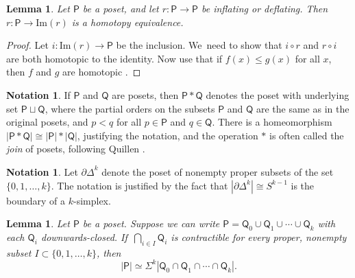 \documentclass[11pt]{article}
\theoremstyle{plain}
\newtheorem{lem}[thm]{Lemma}
\theoremstyle{definition}
\newtheorem{notation}[thm]{Notation}
\newcommand{\Po}{\mathsf{P}}
\begin{document}
\begin{lem}\label{monotone}Let $\mathsf P$ be a poset, and let $r\colon\mathsf P\to \mathsf P$ be inflating or deflating. Then $r\colon\mathsf P\to \mathrm{Im}(r)$ is a homotopy equivalence.
\end{lem}

\begin{proof}Let $i:\mathrm{Im}(r) \to \Po$ be the inclusion. We~need to show that $i \circ r$ and $r \circ i$ are both homotopic to the identity.
Now use that if $f(x) \leq g(x)$ for all $x$, then $f$ and $g$ are homotopic \cite[\S1.3]{quillen-homotopyproperties}.
\end{proof}

\begin{notation}\label{notation:quillenjoin}
If $\mathsf P$ and $\mathsf Q$ are posets, then $\mathsf P \ast \mathsf Q$ denotes the poset with underlying set $\mathsf P \sqcup\mathsf Q$, where the partial orders on the subsets $\mathsf P$ and $\mathsf Q$ are the same as in the original posets, and $p < q$ for all $p \in \mathsf P$ and $q \in \mathsf Q$. There is a homeomorphism $|\mathsf P \ast\mathsf Q| \cong |\mathsf P| \ast |\mathsf Q|$, justifying the notation, and the operation $\ast$ is often called the \emph{join} of posets, following Quillen \cite[p.\,104]{quillen-homotopyproperties}.
\end{notation}

\begin{notation}
Let ${\partial\mathsf\Delta}^k$ denote the poset of nonempty proper subsets of the set $\{0,1,\dots,k\}$. The notation is justified by the fact that $|\partial\mathsf\Delta^k| \cong S^{k-1}$ is the boundary of a $k$-simplex.
\end{notation}

\begin{lem}\label{hocolim2}
Let $\mathsf P$ be a poset. Suppose we can write $\mathsf P = \mathsf Q_0 \cup \mathsf Q_1 \cup \cdots \cup \mathsf Q_k$ with each $\mathsf Q_i$ downwards-closed. If~$\bigcap_{i \in I}\mathsf Q_i$ is contractible for every proper, nonempty subset $I \subset \{0, 1,\ldots, k\}$, then\[
|\mathsf P| \simeq \Sigma^{k} |\mathsf Q_0 \cap \mathsf Q_1\cap \cdots \cap \mathsf Q_k|.
\]
\end{lem}
\end{document}
